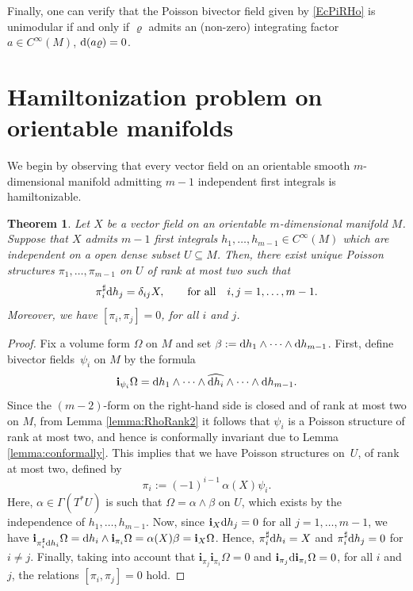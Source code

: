 \documentclass[10pt,a4paper]{amsart}
\newcommand{\dd}{{\rm d}}
\newcommand{\ii}{\mathbf{i}}
\numberwithin{equation}{section}
\newtheorem{Theorem}{Theorem}[section]
\begin{document}
Finally, one can verify that the Poisson bivector field given by \eqref{EcPiRHo} is unimodular if and only if $\varrho$ admits an (non-zero) integrating factor $a \in C^{\infty}(M)$, $\dd(a\varrho)=0$.

\section{Hamiltonization problem on orientable manifolds}
 \label{sec:Hamiltonization problem on orientable manifolds}

We begin by observing that every vector field on an orientable smooth $m$-dimensional manifold admitting $m-1$ independent first integrals is hamiltonizable.

\begin{Theorem}\label{teo:IntegrableHam}
Let $X$ be a vector field on an orientable $m$-dimensional manifold $M$. Suppose that $X$ admits $m-1$ first integrals $h_1, \dots, h_{m-1} \in C^{\infty}(M)$ which are independent on a open dense subset $U \subseteq M$. Then, there exist unique Poisson structures $\pi_{1}, \dots, \pi_{m-1}$ on $U$ of rank at most two such that
 \begin{equation}\label{HamX}
 \pi_{i}^{\sharp}\dd h_{j} = \delta_{ij}X, \qquad \text{for all} \quad i,j = 1, \dots, m-1.
 \end{equation}
Moreover, we have $[\pi_{i},\pi_{j}]=0$, for all $i$ and $j$.
\end{Theorem}
\begin{proof}
Fix a volume form $\Omega$ on $M$ and set $\beta := \dd h_1 \wedge \cdots \wedge \dd h_{m-1}$. First, define bivector fields~$\psi_{i}$ on $M$ by the formula
 \begin{equation}\label{eq:Psi-i}
 \ii_{\psi_{i}}\Omega = \dd h_{1} \wedge \cdots \wedge \widehat{\dd h_{i}} \wedge \cdots \wedge \dd h_{m-1}.
 \end{equation}
Since the $(m-2)$-form on the right-hand side is closed and of rank at most two on $M$, from Lemma \ref{lemma:RhoRank2} it follows that $\psi_{i}$ is a Poisson structure of rank at most two, and hence is conformally invariant due to Lemma \ref{lemma:conformally}. This implies that we have Poisson structures on~$U$, of rank at most two, defined by
 \begin{equation}\label{eq:Pi-i}
 \pi_{i} := (-1)^{i-1}\,\alpha(X)\psi_{i}.
 \end{equation}
Here, $\alpha\in\Gamma(T^*U)$ is such that $\Omega = \alpha \wedge \beta$ on $U$, which exists by the independence of $h_1,\dots,h_{m-1}$. Now, since $\ii_X\dd h_j=0$ for all $j=1,\dots,m-1$, we have $\ii_{\pi_{i}^{\sharp}\dd h_{i}}\Omega = \dd h_{i}\wedge\ii_{\pi_{i}}\Omega = \alpha(X)\beta = \ii_{X}\Omega$. Hence, $\pi_{i}^{\sharp}\dd h_{i} = X$ and $\pi_{i}^{\sharp}\dd h_{j} = 0$ for $i \neq j$. Finally, taking into account that $\ii_{\pi_{j}}\ii_{\pi_{i}}\Omega = 0$ and $\ii_{\pi_{j}}\dd\ii_{\pi_{i}}\Omega = 0$, for all $i$ and $j$, the relations $[\pi_{i},\pi_{j}] = 0$ hold.
\end{proof}
\end{document}
